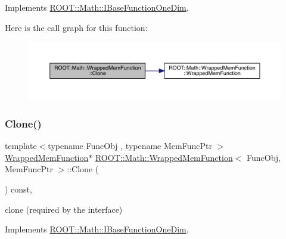 Implements \mbox{\hyperlink{classROOT_1_1Math_1_1IBaseFunctionOneDim_a656dbb4dfc43e8d1566442bfb1a717fd}{R\+O\+O\+T\+::\+Math\+::\+I\+Base\+Function\+One\+Dim}}.

Here is the call graph for this function\+:
\nopagebreak
\begin{figure}[H]
\begin{center}
\leavevmode
\includegraphics[width=350pt]{dd/df6/classROOT_1_1Math_1_1WrappedMemFunction_a6f27e92240e16003ff20c25df6fba1eb_cgraph}
\end{center}
\end{figure}
\mbox{\label{classROOT_1_1Math_1_1WrappedMemFunction_a6f27e92240e16003ff20c25df6fba1eb}} 
\subsubsection{\texorpdfstring{Clone()}{Clone()}\hspace{0.1cm}{\footnotesize\ttfamily [3/3]}}
{\footnotesize\ttfamily template$<$typename Func\+Obj , typename Mem\+Func\+Ptr $>$ \\
\mbox{\hyperlink{classROOT_1_1Math_1_1WrappedMemFunction}{Wrapped\+Mem\+Function}}$\ast$ \mbox{\hyperlink{classROOT_1_1Math_1_1WrappedMemFunction}{R\+O\+O\+T\+::\+Math\+::\+Wrapped\+Mem\+Function}}$<$ Func\+Obj, Mem\+Func\+Ptr $>$\+::Clone (\begin{DoxyParamCaption}{ }\end{DoxyParamCaption}) const\hspace{0.3cm}{\ttfamily [inline]}, {\ttfamily [virtual]}}



clone (required by the interface) 



Implements \mbox{\hyperlink{classROOT_1_1Math_1_1IBaseFunctionOneDim_a656dbb4dfc43e8d1566442bfb1a717fd}{R\+O\+O\+T\+::\+Math\+::\+I\+Base\+Function\+One\+Dim}}.

